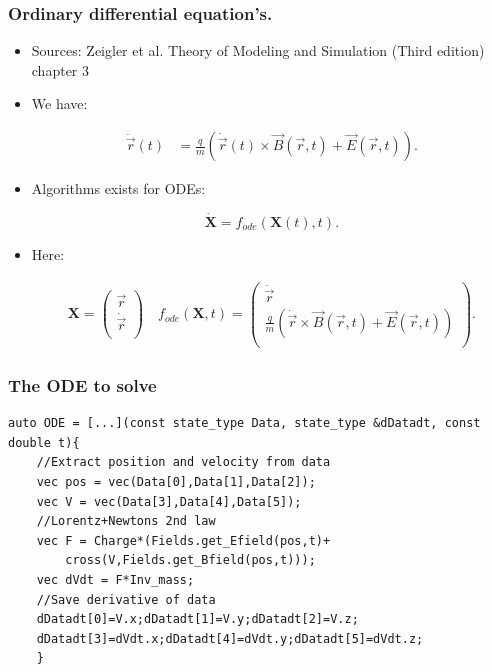 \documentclass{beamer}
\newcommand{\mvec}[2]{
\ensuremath{\left(
\begin{array}{c}
#1\\
#2\\
\end{array}
\right)}
}
\begin{document}
\begin{frame}
\frametitle{Ordinary differential equation's.}
\begin{itemize}
\item<1-> {\color{gray} Sources: Zeigler et al. Theory of Modeling and Simulation (Third edition) chapter 3}

\item<1-> We have:

\begin{align*}
\ddot{\vec{r}}(t) &= \frac{q}{m} ( \dot{\vec{r}}(t)\times \vec{B}(\vec{r},t)+\vec{E}(\vec{r},t)).
\end{align*}

\item<2-> Algorithms exists for ODEs:

\begin{equation*}
\dot{\mathbf{X}} = f_{ode}(\mathbf{X}(t),t).
\end{equation*}


\item<3-> Here:

\begin{align*}
\mathbf{X} = \mvec{\vec{r}}{\dot{\vec{r}}} \quad f_{ode}(\mathbf{X},t) = \mvec{\dot{\vec{r}}}{\frac{q}{m} ( \dot{\vec{r}}\times \vec{B}(\vec{r},t)+\vec{E}(\vec{r},t))}.
\end{align*}
\end{itemize}
\end{frame}

\begin{frame}[fragile]
\frametitle{The ODE to solve}
\begin{lstlisting}
auto ODE = [...](const state_type Data, state_type &dDatadt, const double t){
    //Extract position and velocity from data
    vec pos = vec(Data[0],Data[1],Data[2]);
    vec V = vec(Data[3],Data[4],Data[5]);
    //Lorentz+Newtons 2nd law
    vec F = Charge*(Fields.get_Efield(pos,t)+
        cross(V,Fields.get_Bfield(pos,t)));
    vec dVdt = F*Inv_mass;
    //Save derivative of data
    dDatadt[0]=V.x;dDatadt[1]=V.y;dDatadt[2]=V.z;
    dDatadt[3]=dVdt.x;dDatadt[4]=dVdt.y;dDatadt[5]=dVdt.z;
    }
\end{lstlisting}
\end{frame}
\end{document}
